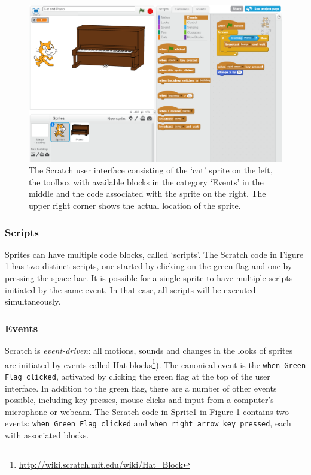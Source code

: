 \documentclass{sig-alternate}
\begin{document}
\begin{figure}
	\begin{center}
		\includegraphics[width=\columnwidth]{fig/ui.png}
		\caption{The Scratch user interface consisting of the `cat' sprite on the left, the toolbox with available blocks in the category `Events' in the middle and the code associated with the sprite on the right. The upper right corner shows the actual location of the sprite.}
		\label{fig:ui}
	\end{center}
\end{figure} 


\subsubsection{Scripts}
Sprites can have multiple code blocks, called `scripts'. The Scratch code in Figure \ref{fig:ui} has two distinct scripts, one started by clicking on the green flag and one by pressing the space bar. It is possible for a single sprite to have multiple scripts initiated by the same event. In that case, all scripts will be executed simultaneously.

\subsubsection{Events}
Scratch is \emph{event-driven}: all motions, sounds and changes in the looks of sprites are initiated by events called Hat blocks\footnote{\url{http://wiki.scratch.mit.edu/wiki/Hat_Block}}). The canonical event is the \texttt{when Green Flag clicked}, activated by clicking the green flag at the top of the user interface. In addition to the green flag, there are a number of other events possible, including key presses, mouse clicks and input from a computer's microphone or webcam. The Scratch code in Sprite1 in Figure \ref{fig:ui} contains two events: \texttt{when Green Flag clicked} and \texttt{when right arrow key pressed}, each with associated blocks.
\end{document}
